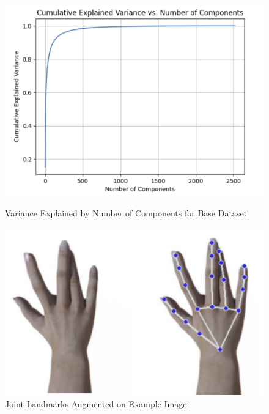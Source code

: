 \documentclass{article}
\begin{document}
\begin{figure}[h]
\begin{center}
\centerline{\includegraphics[width=\columnwidth]{variance_explained_base.png}}
\caption{Variance Explained by Number of Components for Base Dataset}
\end{center}
\begin{center}
\centerline{\includegraphics[width=\columnwidth]{joint_augment.png}}
\caption{Joint Landmarks Augmented on Example Image}
\end{center}
\vskip -0.1in
\end{figure}
\end{document}
